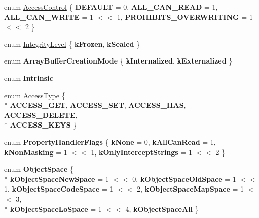 \begin{DoxyCompactItemize}
\item 
enum \hyperlink{namespacev8_a31d8355cb043d7d2dda3f4a52760b64e}{Access\+Control} \{ {\bfseries D\+E\+F\+A\+U\+LT} = 0, 
{\bfseries A\+L\+L\+\_\+\+C\+A\+N\+\_\+\+R\+E\+AD} = 1, 
{\bfseries A\+L\+L\+\_\+\+C\+A\+N\+\_\+\+W\+R\+I\+TE} = 1 $<$$<$ 1, 
{\bfseries P\+R\+O\+H\+I\+B\+I\+T\+S\+\_\+\+O\+V\+E\+R\+W\+R\+I\+T\+I\+NG} = 1 $<$$<$ 2
 \}
\item 
enum \hyperlink{namespacev8_a02642d03ff1eecc2fd358626499c2e30}{Integrity\+Level} \{ {\bfseries k\+Frozen}, 
{\bfseries k\+Sealed}
 \}
\item 
enum {\bfseries Array\+Buffer\+Creation\+Mode} \{ {\bfseries k\+Internalized}, 
{\bfseries k\+Externalized}
 \}\hypertarget{namespacev8_aead63bf88a59e18b3768de9ac8d4b98d}{}\label{namespacev8_aead63bf88a59e18b3768de9ac8d4b98d}

\item 
enum {\bfseries Intrinsic} \hypertarget{namespacev8_a67f8ea6a2abeace49b9658da6a3267ab}{}\label{namespacev8_a67f8ea6a2abeace49b9658da6a3267ab}

\item 
enum \hyperlink{namespacev8_add8bef6469c5b94706584124e610046c}{Access\+Type} \{ \\*
{\bfseries A\+C\+C\+E\+S\+S\+\_\+\+G\+ET}, 
{\bfseries A\+C\+C\+E\+S\+S\+\_\+\+S\+ET}, 
{\bfseries A\+C\+C\+E\+S\+S\+\_\+\+H\+AS}, 
{\bfseries A\+C\+C\+E\+S\+S\+\_\+\+D\+E\+L\+E\+TE}, 
\\*
{\bfseries A\+C\+C\+E\+S\+S\+\_\+\+K\+E\+YS}
 \}
\item 
enum {\bfseries Property\+Handler\+Flags} \{ {\bfseries k\+None} = 0, 
{\bfseries k\+All\+Can\+Read} = 1, 
{\bfseries k\+Non\+Masking} = 1 $<$$<$ 1, 
{\bfseries k\+Only\+Intercept\+Strings} = 1 $<$$<$ 2
 \}\hypertarget{namespacev8_af4789f0aeb8680e353901a35810cac1a}{}\label{namespacev8_af4789f0aeb8680e353901a35810cac1a}

\item 
enum {\bfseries Object\+Space} \{ \\*
{\bfseries k\+Object\+Space\+New\+Space} = 1 $<$$<$ 0, 
{\bfseries k\+Object\+Space\+Old\+Space} = 1 $<$$<$ 1, 
{\bfseries k\+Object\+Space\+Code\+Space} = 1 $<$$<$ 2, 
{\bfseries k\+Object\+Space\+Map\+Space} = 1 $<$$<$ 3, 
\\*
{\bfseries k\+Object\+Space\+Lo\+Space} = 1 $<$$<$ 4, 
{\bfseries k\+Object\+Space\+All}
 \}\hypertarget{namespacev8_ae7bc5b0bd1100e94d78de255daa8ebc3}{}\label{namespacev8_ae7bc5b0bd1100e94d78de255daa8ebc3}


\end{DoxyCompactItemize}
